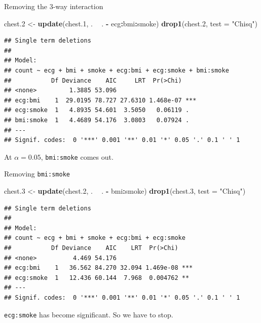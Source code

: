\documentclass[ignorenonframetext,]{beamer}
\newenvironment{Shaded}{\begin{snugshade}}{\end{snugshade}}
\newcommand{\DataTypeTok}[1]{\textcolor[rgb]{0.13,0.29,0.53}{#1}}
\newcommand{\FloatTok}[1]{\textcolor[rgb]{0.00,0.00,0.81}{#1}}
\newcommand{\KeywordTok}[1]{\textcolor[rgb]{0.13,0.29,0.53}{\textbf{#1}}}
\newcommand{\NormalTok}[1]{#1}
\newcommand{\OperatorTok}[1]{\textcolor[rgb]{0.81,0.36,0.00}{\textbf{#1}}}
\newcommand{\StringTok}[1]{\textcolor[rgb]{0.31,0.60,0.02}{#1}}
\begin{document}
\begin{frame}[fragile]{Removing the 3-way interaction}
\protect\hypertarget{removing-the-3-way-interaction}{}

\small

\begin{Shaded}
\begin{Highlighting}[]
\NormalTok{chest}\FloatTok{.2}\NormalTok{ <-}\StringTok{ }\KeywordTok{update}\NormalTok{(chest}\FloatTok{.1}\NormalTok{, . }\OperatorTok{~}\StringTok{ }\NormalTok{. }\OperatorTok{-}\StringTok{ }\NormalTok{ecg}\OperatorTok{:}\NormalTok{bmi}\OperatorTok{:}\NormalTok{smoke)}
\KeywordTok{drop1}\NormalTok{(chest}\FloatTok{.2}\NormalTok{, }\DataTypeTok{test =} \StringTok{"Chisq"}\NormalTok{)}
\end{Highlighting}
\end{Shaded}

\begin{verbatim}
## Single term deletions
## 
## Model:
## count ~ ecg + bmi + smoke + ecg:bmi + ecg:smoke + bmi:smoke
##           Df Deviance    AIC     LRT  Pr(>Chi)    
## <none>         1.3885 53.096                      
## ecg:bmi    1  29.0195 78.727 27.6310 1.468e-07 ***
## ecg:smoke  1   4.8935 54.601  3.5050   0.06119 .  
## bmi:smoke  1   4.4689 54.176  3.0803   0.07924 .  
## ---
## Signif. codes:  0 '***' 0.001 '**' 0.01 '*' 0.05 '.' 0.1 ' ' 1
\end{verbatim}

\normalsize

At \(\alpha=0.05\), \texttt{bmi:smoke} comes out.

\end{frame}

\begin{frame}[fragile]{Removing \texttt{bmi:smoke}}
\protect\hypertarget{removing-bmismoke}{}

\small

\begin{Shaded}
\begin{Highlighting}[]
\NormalTok{chest}\FloatTok{.3}\NormalTok{ <-}\StringTok{ }\KeywordTok{update}\NormalTok{(chest}\FloatTok{.2}\NormalTok{, . }\OperatorTok{~}\StringTok{ }\NormalTok{. }\OperatorTok{-}\StringTok{ }\NormalTok{bmi}\OperatorTok{:}\NormalTok{smoke)}
\KeywordTok{drop1}\NormalTok{(chest}\FloatTok{.3}\NormalTok{, }\DataTypeTok{test =} \StringTok{"Chisq"}\NormalTok{)}
\end{Highlighting}
\end{Shaded}

\begin{verbatim}
## Single term deletions
## 
## Model:
## count ~ ecg + bmi + smoke + ecg:bmi + ecg:smoke
##           Df Deviance    AIC    LRT  Pr(>Chi)    
## <none>          4.469 54.176                     
## ecg:bmi    1   36.562 84.270 32.094 1.469e-08 ***
## ecg:smoke  1   12.436 60.144  7.968  0.004762 ** 
## ---
## Signif. codes:  0 '***' 0.001 '**' 0.01 '*' 0.05 '.' 0.1 ' ' 1
\end{verbatim}

\normalsize

\texttt{ecg:smoke} has become significant. So we have to stop.

\end{frame}
\end{document}

